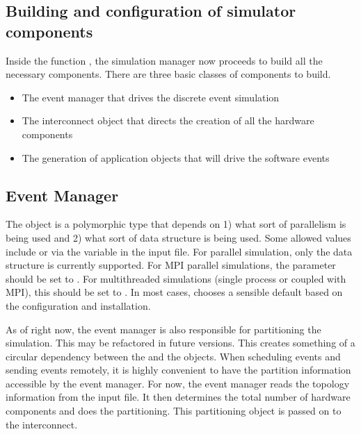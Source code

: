 \begin{enumerate}
\section{Building and configuration of simulator components}\label{sec:buildConfig}
Inside the function ,
the simulation manager now proceeds to build all the necessary components.
There are three basic classes of components to build.

\begin{itemize}
\item The event manager that drives the discrete event simulation
\item The interconnect object that directs the creation of all the hardware components
\item The generation of application objects that will drive the software events
\end{itemize}

\subsection{Event Manager}\label{sec:eventMan}
The  object is a polymorphic type that depends on 1) what sort of parallelism is being used and 2) what sort of data structure is being used.
Some allowed values include  or  via the  variable in the input file.
For parallel simulation, only the  data structure is currently supported.
For MPI parallel simulations, the  parameter should be set to .
For multithreaded simulations (single process or coupled with MPI), this should be set to .
In most cases, \sstmacro chooses a sensible default based on the configuration and installation.

As of right now, the event manager is also responsible for partitioning the simulation.
This may be refactored in future versions.
This creates something of a circular dependency between the  and the  objects.
When scheduling events and sending events remotely,
it is highly convenient to have the partition information accessible by the event manager.
For now, the event manager reads the topology information from the input file.
It then determines the total number of hardware components and does the partitioning.
This partitioning object is passed on to the interconnect.


\end{enumerate}
